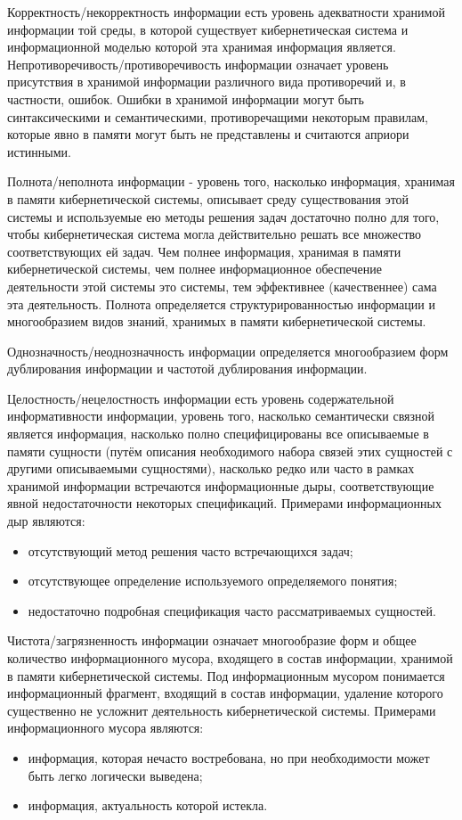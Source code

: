 Корректность/некорректность информации есть уровень адекватности хранимой информации той среды, в которой существует кибернетическая система и информационной моделью которой эта хранимая информация является. 
Непротиворечивость/противоречивость информации означает уровень присутствия в хранимой информации различного вида противоречий и, в частности, ошибок. 
Ошибки в хранимой информации могут быть синтаксическими и семантическими, противоречащими некоторым правилам, которые явно в памяти могут быть не представлены и считаются априори истинными.

Полнота/неполнота информации - уровень того, насколько информация, хранимая в памяти кибернетической системы, описывает среду существования этой системы и используемые ею методы решения задач достаточно полно для того, чтобы кибернетическая система могла действительно решать все множество соответствующих ей задач. 
Чем полнее информация, хранимая в памяти кибернетической системы, чем полнее информационное обеспечение деятельности этой системы это системы, тем эффективнее (качественнее) сама эта деятельность. 
Полнота определяется структурированностью информации и многообразием видов знаний, хранимых в памяти кибернетической системы.

Однозначность/неоднозначность информации определяется многообразием форм дублирования информации и частотой дублирования информации.

Целостность/нецелостность информации есть уровень содержательной информативности информации, уровень того, насколько семантически связной является информация, насколько полно специфицированы все описываемые в памяти сущности (путём описания необходимого набора связей этих сущностей с другими описываемыми сущностями), насколько редко или часто в рамках хранимой информации встречаются информационные дыры, соответствующие явной недостаточности некоторых спецификаций. 
Примерами информационных дыр являются:
\begin{itemize}
    \item{отсутствующий метод решения часто встречающихся задач;}
    \item{отсутствующее определение используемого определяемого понятия;}
    \item{недостаточно подробная спецификация часто рассматриваемых сущностей.}
\end{itemize}

Чистота/загрязненность информации означает многообразие форм и общее количество информационного мусора, входящего в состав информации, хранимой в памяти кибернетической системы.
Под информационным мусором понимается информационный фрагмент, входящий в состав информации, удаление которого существенно не усложнит деятельность кибернетической системы.
Примерами информационного мусора являются:
\begin{itemize}
    \item{информация, которая нечасто востребована, но при необходимости может быть легко логически выведена;}
    \item{информация, актуальность которой истекла.}
\end{itemize}

